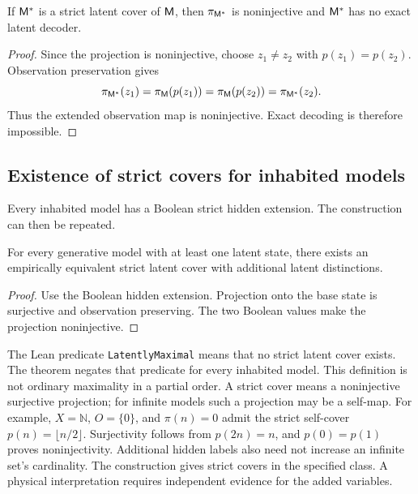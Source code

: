\begin{theorem}
If \(\mathsf M^{\ast}\) is a strict latent cover of \(\mathsf M\), then \(\pi_{\mathsf M^{\ast}}\) is noninjective and \(\mathsf M^{\ast}\) has no exact latent decoder.
\end{theorem}

\begin{proof}
Since the projection is noninjective, choose \(z_1\neq z_2\) with \(p(z_1)=p(z_2)\). Observation preservation gives
\[
\pi_{\mathsf M^{\ast}}(z_1)
=\pi_\mathsf M(p(z_1))
=\pi_\mathsf M(p(z_2))
=\pi_{\mathsf M^{\ast}}(z_2).
\]
Thus the extended observation map is noninjective. Exact decoding is therefore impossible.
\end{proof}
\subsection{Existence of strict covers for inhabited models}

Every inhabited model has a Boolean strict hidden extension. The construction can then be repeated.

\begin{theorem}
For every generative model with at least one latent state, there exists an empirically equivalent strict latent cover with additional latent distinctions.
\end{theorem}

\begin{proof}
Use the Boolean hidden extension. Projection onto the base state is surjective and observation preserving. The two Boolean values make the projection noninjective.
\end{proof}
The Lean predicate \texttt{LatentlyMaximal} means that no strict latent cover exists. The theorem negates that predicate for every inhabited model. This definition is not ordinary maximality in a partial order. A strict cover means a noninjective surjective projection; for infinite models such a projection may be a self-map. For example, \(X=\mathbb N\), \(O=\{0\}\), and \(\pi(n)=0\) admit the strict self-cover \(p(n)=\lfloor n/2\rfloor\). Surjectivity follows from \(p(2n)=n\), and \(p(0)=p(1)\) proves noninjectivity. Additional hidden labels also need not increase an infinite set's cardinality. The construction gives strict covers in the specified class. A physical interpretation requires independent evidence for the added variables.
